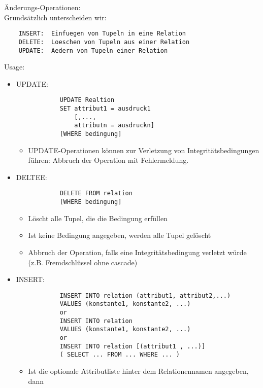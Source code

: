 \"Anderungs-Operationen:\\
Grunds\"atzlich unterscheiden wir:
\begin{verbatim}
    INSERT:  Einfuegen von Tupeln in eine Relation
    DELETE:  Loeschen von Tupeln aus einer Relation
    UPDATE:  Aedern von Tupeln einer Relation
\end{verbatim}
\begin{remark}
    Usage:
    \begin{itemize}
        \item UPDATE: \begin{verbatim}
            UPDATE Realtion
            SET attribut1 = ausdruck1
                [,...,
                attributn = ausdruckn]
            [WHERE bedingung]
        \end{verbatim}
              \begin{itemize}
                  \item UPDATE-Operationen k\"onnen zur Verletzung von Integrit\"atsbedingungen f\"uhren: Abbruch der Operation mit Fehlermeldung.
              \end{itemize}
        \item DELTEE: \begin{verbatim}
            DELETE FROM relation
            [WHERE bedingung]
        \end{verbatim}
              \begin{itemize}
                  \item L\"oscht alle Tupel, die die Bedingung erfüllen
                  \item Ist keine Bedingung angegeben, werden alle Tupel
                        gel\"oscht
                  \item Abbruch der Operation, falls eine Integrit\"atsbedingung verletzt w\"urde (z.B. Fremdschlüssel ohne cascade)
              \end{itemize}
        \item INSERT:\begin{verbatim}
            INSERT INTO relation (attribut1, attribut2,...)
            VALUES (konstante1, konstante2, ...)
            or
            INSERT INTO relation 
            VALUES (konstante1, konstante2, ...)
            or
            INSERT INTO relation [(attribut1 , ...)]
            ( SELECT ... FROM ... WHERE ... )
        \end{verbatim}
        \begin{itemize}
            \item Ist die optionale Attributliste hinter dem Relationennamen angegeben, dann

\end{itemize}
\end{itemize}
\end{remark}

